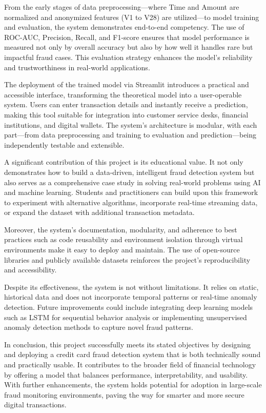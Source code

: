\documentclass[11pt,a4paper]{article}
\begin{document}
From the early stages of data preprocessing—where Time and Amount are normalized and 
anonymized features (V1 to V28) are utilized—to model training and evaluation, the system 
demonstrates end-to-end competency. The use of ROC-AUC, Precision, Recall, and F1-score 
ensures that model performance is measured not only by overall accuracy but also by how well it 
handles rare but impactful fraud cases. This evaluation strategy enhances the model's reliability and 
trustworthiness in real-world applications. 

The deployment of the trained model via Streamlit introduces a practical and accessible interface, 
transforming the theoretical model into a user-operable system. Users can enter transaction details 
and instantly receive a prediction, making this tool suitable for integration into customer service 
desks, financial institutions, and digital wallets. The system's architecture is modular, with each 
part—from data preprocessing and training to evaluation and prediction—being independently 
testable and extensible. 

A significant contribution of this project is its educational value. It not only demonstrates how to 
build a data-driven, intelligent fraud detection system but also serves as a comprehensive case study 
in solving real-world problems using AI and machine learning. Students and practitioners can build 
upon this framework to experiment with alternative algorithms, incorporate real-time streaming 
data, or expand the dataset with additional transaction metadata. 

Moreover, the system's documentation, modularity, and adherence to best practices such as code 
reusability and environment isolation through virtual environments make it easy to deploy and 
maintain. The use of open-source libraries and publicly available datasets reinforces the project’s 
reproducibility and accessibility. 

Despite its effectiveness, the system is not without limitations. It relies on static, historical data and 
does not incorporate temporal patterns or real-time anomaly detection. Future improvements could 
include integrating deep learning models such as LSTM for sequential behavior analysis or 
implementing unsupervised anomaly detection methods to capture novel fraud patterns. 

In conclusion, this project successfully meets its stated objectives by designing and deploying a 
credit card fraud detection system that is both technically sound and practically usable. It 
contributes to the broader field of financial technology by offering a model that balances 
performance, interpretability, and usability. With further enhancements, the system holds potential 
for adoption in large-scale fraud monitoring environments, paving the way for smarter and more 
secure digital transactions. 
\end{document}
